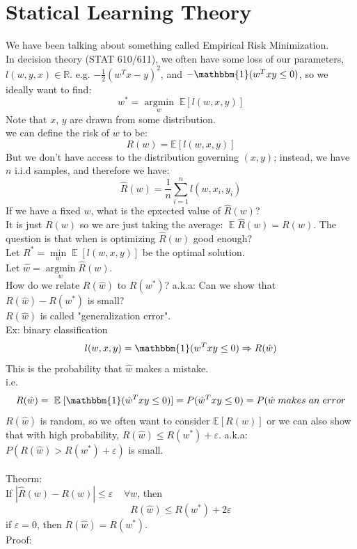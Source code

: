\documentclass[twoside]{article}
\theoremstyle{definition}
\theoremstyle{definition}
\theoremstyle{remark}
\def\R{{\mathbb R}}
\def\E{{\mathbb E}}
\begin{document}
\section{Statical Learning Theory}
We have been talking about something called Empirical Risk Minimization. \\
In decision theory (STAT 610/611), we often have some loss of our parameters, $l(w,y,x) \in \R$. e.g. $-\frac{1}{2}(w^Tx - y)^2$, and $-\mathbbm{1}(w^Txy \leq 0)$, so we ideally want to find:
\[w^* = \underset{w}{\operatorname{argmin}}\;\E[l(w,x,y)]\]
Note that $x$, $y$ are drawn from some distribution. \\
we can define the risk of $w$ to be:
\[R(w) = \E[l(w,x,y)]\]
But we don't have access to the distribution governing $(x,y)$; instead, we have $n$ i.i.d samples, and therefore we have:
\[\hat R (w) = \frac{1}{n} \sum_{i=1}^n l(w,x_i,y_i)\]
If we have a fixed $w$, what is the epxected value of $\hat R (w)$? \\
It is just $R(w)$ so we are just taking the average: $\;\E \;\hat R (w) = R(w)$.
The question is that when is optimizing $\hat R (w)$ good enough?\\
Let $R^* = \underset{w}{\operatorname{min}}\;\E\;[l(w,x,y)]$ be the optimal solution.\\
Let $\hat w = \underset{w}{\operatorname{argmin}} \hat R (w)$. \\
How do we relate $R(\hat w)$ to $R(w^*)$? a.k.a: Can we show that  $R(\hat w) - R(w^*)$ is small?\\
$R(\hat w)$ is called "generalization error".\\
Ex: binary classification \\
\[l(w,x,y) = \mathbbm{1} (w^T x y \leq 0) \Rightarrow R(\hat w)\]
This is the probability that $\hat w$ makes a mistake. \\
i.e. \[R(\hat w) = \;\E \;[\mathbbm{1}(\hat w^T xy \leq 0)] = P(\hat w^T xy \leq 0)= P(\hat w\; makes \; an \; error\]
$R(\hat w)$ is random, so we often want to consider $\E[R(w)]$ or we can also show that with high probability, $R(\hat w) \leq R(w^*) + \varepsilon$. a.k.a: $P(R(\hat w) > R(w^*)+ \varepsilon)$ is small.\\ 
\\
Theorm:\\
If $|\hat R (w) - R(w)| \leq \varepsilon \;\;\;\; \forall w$, then
\[ R(\hat w) \leq R(w^*) + 2 \varepsilon\]
if $\varepsilon = 0$, then $R(\hat w) = R(w^*)$. \\
Proof:\\
\end{document}
